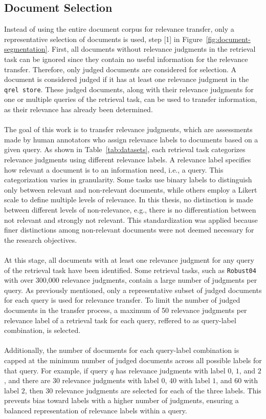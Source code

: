 \subsection{Document Selection}\label{document-selection}

Instead of using the entire document corpus for relevance transfer, only a representative selection of documents is used, step [1] in Figure~\ref{fig:document-segmentation}. First, all documents without relevance judgments in the retrieval task can be ignored since they contain no useful information for the relevance transfer. Therefore, only judged documents are considered for selection. A document is considered judged if it has at least one relevance judgment in the \texttt{qrel store}. These judged documents, along with their relevance judgments for one or multiple queries of the retrieval task, can be used to transfer information, as their relevance has already been determined.
\\\\
The goal of this work is to transfer relevance judgments, which are assessments made by human annotators who assign relevance labels to documents based on a given query. As shown in Table~\ref{tab:datasets}, each retrieval task categorizes relevance judgments using different relevance labels. A relevance label specifies how relevant a document is to an information need, i.e., a query. This categorization varies in granularity. Some tasks use binary labels to distinguish only between relevant and non-relevant documents, while others employ a \mbox{Likert} scale to define multiple levels of relevance. In this thesis, no distinction is made between different levels of non-relevance, e.g., there is no differentiation between \glqq not relevant\grqq{} and \glqq strongly not relevant\grqq{}. This standardization was applied because finer distinctions among non-relevant documents were not deemed necessary for the research objectives.
\\\\
At this stage, all documents with at least one relevance judgment for any query of the retrieval task have been identified. Some retrieval tasks, such as \texttt{Robust04} with over 300,000 relevance judgments, contain a large number of judgments per query. As previously mentioned, only a representative subset of judged documents for each query is used for relevance transfer. To limit the number of judged documents in the transfer process, a maximum of 50 relevance judgments per relevance label of a retrieval task for each query, reffered to as query-label combination, is selected.
\\\\
Additionally, the number of documents for each query-label combination is capped at the minimum number of judged documents across all possible labels for that query. For example, if query $q$ has relevance judgments with label $0$, $1$, and $2$, and there are 30 relevance judgments with label $0$, 40 with label $1$, and 60 with label $2$, then 30 relevance judgments are selected for each of the three labels. This prevents bias toward labels with a higher number of judgments, ensuring a balanced representation of relevance labels within a query.

